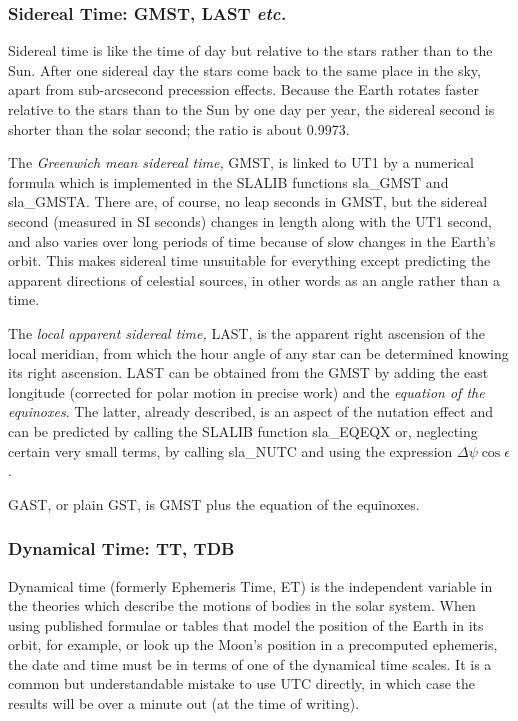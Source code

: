 \documentclass[11pt,twoside,nolof]{starlink}
\begin{document}
\subsubsection{Sidereal Time: GMST, LAST \textit{etc.}}
Sidereal time is like the time of day but relative to the
stars rather than to the Sun.  After
one sidereal day the stars come back to the same place in the
sky, apart from sub-arcsecond precession effects.  Because the Earth
rotates faster relative to the stars than to the Sun by one day
per year, the sidereal second is shorter than the solar
second; the ratio is about 0.9973.

The \textit{Greenwich mean sidereal time,} GMST, is
linked to UT1 by a numerical formula which
is implemented in the SLALIB functions
sla\_GMST
and
sla\_GMSTA.
There are, of course, no leap seconds in GMST, but the sidereal
second (measured in SI seconds)
changes in length along with the UT1 second, and also varies
over long periods of time because of slow changes in the Earth's
orbit.  This makes sidereal time unsuitable for everything except
predicting the apparent directions of celestial sources, in other
words as an angle rather than a time.

The \textit{local apparent sidereal time,} LAST, is the apparent right
ascension of the local meridian, from which the hour angle of any
star can be determined knowing its right
ascension.  LAST can be obtained from the
GMST by adding the east longitude (corrected for polar motion
in precise work) and the \textit{equation of the equinoxes}.  The
latter, already described, is an aspect of the nutation effect
and can be predicted by calling the SLALIB function
sla\_EQEQX
or, neglecting certain very small terms, by calling
sla\_NUTC
and using the expression $\Delta\psi\cos\epsilon$.

GAST, or plain GST, is GMST plus the equation of the equinoxes.

\subsubsection{Dynamical Time: TT, TDB}
Dynamical time (formerly Ephemeris Time, ET)
is the independent variable in the theories
which describe the motions of bodies in the solar system.  When
using published formulae or
tables that model the position of the
Earth in its orbit, for example, or look up
the Moon's position in a precomputed ephemeris, the date and time
must be in terms of one of the dynamical time scales.  It
is a common but understandable mistake to use UTC directly, in which
case the results will be over a minute out (at the time of writing).
\end{document}
